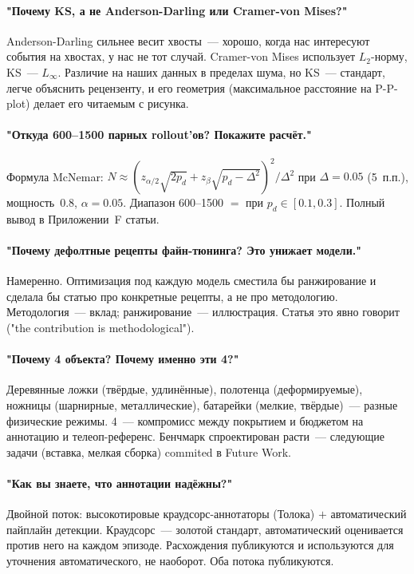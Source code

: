 \documentclass[11pt]{article}
\begin{document}
\paragraph{"Почему KS, а не Anderson-Darling или Cramer-von Mises?"} Anderson-Darling сильнее весит хвосты~--- хорошо, когда нас интересуют события на хвостах, у нас не тот случай. Cramer-von Mises использует $L_2$-норму, KS~--- $L_\infty$. Различие на наших данных в пределах шума, но KS~--- стандарт, легче объяснить рецензенту, и его геометрия (максимальное расстояние на P-P-plot) делает его читаемым с рисунка.

\paragraph{"Откуда 600--1500 парных rollout'ов? Покажите расчёт."} Формула McNemar: $N \approx (z_{\alpha/2}\sqrt{2p_d} + z_\beta\sqrt{p_d - \Delta^2})^2/\Delta^2$ при $\Delta=0.05$ (5~п.п.), мощность~0.8, $\alpha=0.05$. Диапазон 600--1500 $=$ при $p_d \in [0.1, 0.3]$. Полный вывод в Приложении~F статьи.

\paragraph{"Почему дефолтные рецепты файн-тюнинга? Это унижает модели."} Намеренно. Оптимизация под каждую модель сместила бы ранжирование и сделала бы статью про конкретные рецепты, а не про методологию. Методология~--- вклад; ранжирование~--- иллюстрация. Статья это явно говорит ("the contribution is methodological").

\paragraph{"Почему 4 объекта? Почему именно эти 4?"} Деревянные ложки (твёрдые, удлинённые), полотенца (деформируемые), ножницы (шарнирные, металлические), батарейки (мелкие, твёрдые)~--- разные физические режимы. 4~--- компромисс между покрытием и бюджетом на аннотацию и телеоп-референс. Бенчмарк спроектирован расти~--- следующие задачи (вставка, мелкая сборка) commited в Future Work.

\paragraph{"Как вы знаете, что аннотации надёжны?"} Двойной поток: высокотировые краудсорс-аннотаторы (Толока) $+$ автоматический пайплайн детекции. Краудсорс~--- золотой стандарт, автоматический оценивается против него на каждом эпизоде. Расхождения публикуются и используются для уточнения автоматического, не наоборот. Оба потока публикуются.
\end{document}
